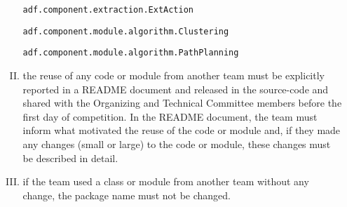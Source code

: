 \documentclass{article}
\begin{document}
\begin{enumerate}[(a)]
\begin{enumerate}[I.]
  \texttt{adf.component.extraction.ExtAction}

  \texttt{adf.component.module.algorithm.Clustering}

  \texttt{adf.component.module.algorithm.PathPlanning}
  \item the reuse of any code or module from another team must be explicitly reported in a README document and released in the source-code and shared with the Organizing and Technical Committee members before the first day of competition. In the README document, the team must inform what motivated the reuse of the code or module and, if they made any changes (small or large) to the code or module, these changes must be described in detail.
  \item if the team used a class or module from another team without any change, the package name must not be changed.
\end{enumerate}


\end{enumerate}
\end{document}
